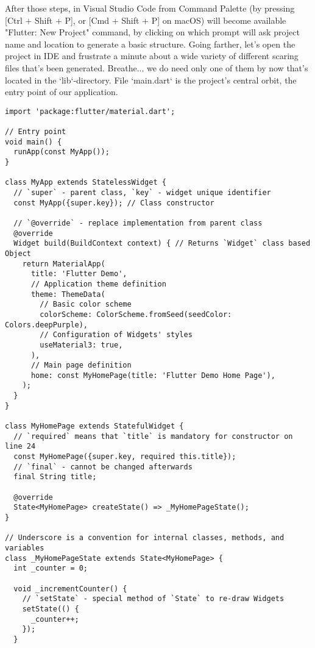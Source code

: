 After those steps, in Visual Studio Code from Command Palette (by pressing [Ctrl + Shift + P], or [Cmd + Shift + P] 
on macOS) will become available "Flutter: New Project" command, by clicking on which prompt will ask project name 
and location to generate a basic structure. Going farther, let's open the project in IDE and frustrate a minute 
about a wide variety of different scaring files that's been generated. Breathe... we do need only one of them by 
now that's located in the `lib`-directory. File `main.dart` is the project's central orbit, the entry point of our 
application.

\begin{lstlisting}
import 'package:flutter/material.dart';

// Entry point
void main() {
  runApp(const MyApp());
}

class MyApp extends StatelessWidget {
  // `super` - parent class, `key` - widget unique identifier
  const MyApp({super.key}); // Class constructor
  
  // `@override` - replace implementation from parent class
  @override
  Widget build(BuildContext context) { // Returns `Widget` class based Object
    return MaterialApp(
      title: 'Flutter Demo',
      // Application theme definition
      theme: ThemeData(
        // Basic color scheme
        colorScheme: ColorScheme.fromSeed(seedColor: Colors.deepPurple),
        // Configuration of Widgets' styles
        useMaterial3: true,
      ),
      // Main page definition
      home: const MyHomePage(title: 'Flutter Demo Home Page'),
    );
  }
}

class MyHomePage extends StatefulWidget {
  // `required` means that `title` is mandatory for constructor on line 24
  const MyHomePage({super.key, required this.title});
  // `final` - cannot be changed afterwards
  final String title;

  @override
  State<MyHomePage> createState() => _MyHomePageState();
}

// Underscore is a convention for internal classes, methods, and variables
class _MyHomePageState extends State<MyHomePage> {
  int _counter = 0;

  void _incrementCounter() {
    // `setState` - special method of `State` to re-draw Widgets
    setState(() {
      _counter++;
    });
  }


\end{lstlisting}
